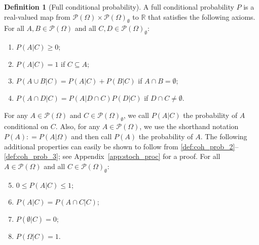 \documentclass[10pt,a4paper]{paper}
\theoremstyle{definition}
\newtheorem{definition}{Definition}
\newcommand{\reals}{\mathbb{R}}
\newcommand{\paths}{\Omega}
\newcommand{\power}{\mathcal{P}(\paths)}
\newcommand{\nonemptypower}{\power_{\emptyset}}
\newcommand{\coloneqq}{:\!=}
\begin{document}
\begin{definition}[Full conditional probability]\label{def:cond_prob}
A full conditional probability $P$ is a real-valued map from $\power\times\nonemptypower$ to $\reals$ that satisfies the following axioms. For all $A,B\in\power$ and all \mbox{$C,D\in\nonemptypower$}:
\vspace{5pt}

\begin{enumerate}[label=F\arabic*:,ref=F\arabic*]
\item
$P(A\vert C)\geq 0$;\label{def:coh_prob_2}
\item
$P(A\vert C)=1$ if $C\subseteq A$;\label{def:coh_prob_1}
\item
$P(A\cup B\vert C)=P(A\vert C)+P(B\vert C)$ if $A\cap B=\emptyset$;\label{def:coh_prob_3}
\item
$P(A\cap D\vert C)=P(A\vert D\cap C)P(D\vert C)$ if $D\cap C\neq\emptyset$.\label{def:coh_prob_6}
\end{enumerate}
\vspace{5pt}

\noindent
For any $A\in\power$ and $C\in\nonemptypower$, we call $P(A\vert C)$ the probability of $A$ conditional on $C$. Also, for any $A\in\power$, we use the shorthand notation $P(A)\coloneqq P(A\vert\paths)$ and then call $P(A)$ the probability of $A$.
The following additional properties can easily be shown to follow from \ref{def:coh_prob_2}--\ref{def:coh_prob_3}; see Appendix~\ref{app:stoch_proc} for a proof. For all $A\in\power$ and all $C\in\nonemptypower$:
\vspace{5pt}
\begin{enumerate}[label=F\arabic*:,ref=F\arabic*]
\setcounter{enumi}{4}
\item
$0\leq P(A\vert C)\leq 1$;\label{def:coh_prob_2b}
\item
$P(A\vert C)=P(A\cap C\vert C)$;\label{def:coh_prob_7}
\item
$P(\emptyset\vert C)=0$;\label{def:coh_prob_8}
\item
$P(\Omega\vert C)=1$.\label{def:coh_prob_5}
\end{enumerate}
\vspace{2pt}
\end{definition}
\end{document}
